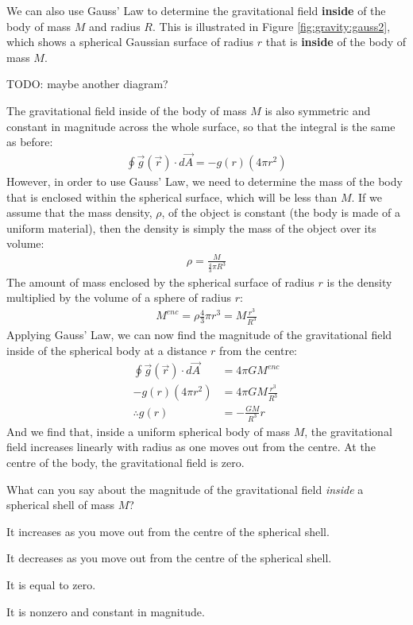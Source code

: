 We can also use Gauss' Law to determine the gravitational field \textbf{inside} of the body of mass $M$ and radius $R$. This is illustrated in Figure \ref{fig:gravity:gauss2}, which shows a spherical Gaussian surface of radius $r$ that is \textbf{inside} of the body of mass $M$.

TODO: maybe another diagram?

The gravitational field inside of the body of mass $M$ is also symmetric 
and  constant in magnitude across the whole surface, %
so that the integral is the same as before:
\begin{align*}
\oint \vec g(\vec r) \cdot d\vec A=-g(r)(4\pi r^2)
\end{align*}
However, in order to use Gauss' Law, we need to determine the mass of the body that is enclosed within the spherical surface, which will be less than $M$. If we assume that the mass density, $\rho$, of the object is constant (the body is made of a uniform material), then the density is simply the mass of the object over its volume:
\begin{align*}
\rho = \frac{M}{\frac{4}{3}\pi R^3}
\end{align*}
The amount of mass enclosed by the spherical surface of radius $r$ is the density multiplied by the volume of a sphere of radius $r$:
\begin{align*}
M^{enc} = \rho \frac{4}{3}\pi r^3 = M\frac{r^3}{R^3}
\end{align*}
Applying Gauss' Law, we can now find the magnitude of the gravitational field inside of the spherical body at a distance $r$ from the centre:
\begin{align*}
\oint \vec g(\vec r) \cdot d\vec A &= 4\pi G M^{enc}\\
-g(r)(4\pi r^2) &= 4\pi G M\frac{r^3}{R^3}\\
\therefore g(r) &= - \frac{G M}{R^3}r
\end{align*}
And we find that, inside a uniform spherical body of mass $M$, the gravitational field increases linearly with radius as one moves out from the centre. At the centre of the body, the gravitational field is zero. 

\begin{checkpoint}
\begin{MCquestion}{What can you say about the magnitude of the gravitational field \textit{inside} a spherical shell of mass $M$?}
\item It increases as you move out from the centre of the spherical shell. 
\item It decreases as you move out from the centre of the spherical shell. 
\item It is equal to zero. \correct
\item It is nonzero and constant in magnitude.
\end{MCquestion}
\end{checkpoint}

